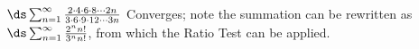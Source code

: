 {$\ds\sum_{n=1}^\infty \frac{2\cdot4\cdot6\cdot8\cdots 2n}{3\cdot6\cdot9\cdot12\cdots 3n}$
}
{Converges; note the summation can be rewritten as $\ds\sum_{n=1}^\infty \frac{2^nn!}{3^nn!}$, from which the Ratio Test can be applied.
}